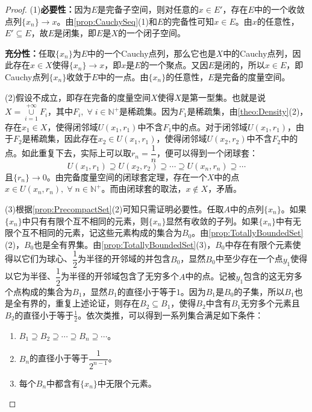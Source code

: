 \begin{proof}
	(1)\textbf{必要性：}因为$E$是完备子空间，则对任意的$x\in E'$，存在$E$中的一个收敛点列$\{x_n\}\to x$。由\cref{prop:CauchySeq}(1)和$E$的完备性可知$x\in E$。由$x$的任意性，$E'\subseteq E$，故$E$是闭集，即$E$是$X$的一个闭子空间。\par
	\textbf{充分性：}任取$\{x_n\}$为$E$中的一个Cauchy点列，那么它也是$X$中的Cauchy点列，因此存在$x\in X$使得$\{x_n\}\to x$，即$x$是$E$的一个聚点。又因$E$是闭的，所以$x\in E$，即Cauchy点列$\{x_n\}$收敛于$E$中的一点。由$\{x_n\}$的任意性，$E$是完备的度量空间。\par
	(2)假设不成立，即存在完备的度量空间$X$使得$X$是第一型集。也就是说$X=\underset{i=1}{\overset{+\infty}{\cup}}F_i$，其中$F_i,\;\forall\;i\in\mathbb{N}^+$是稀疏集。因为$F_1$是稀疏集，由\cref{theo:Density}(2)，存在$x_1\in X$，使得闭邻域$U(x_1,r_1)$中不含$F_1$中的点。对于闭邻域$U(x_1,r_1)$，由于$F_2$是稀疏集，因此存在$x_2\in U(x_1,r_1)$，使得闭邻域$U(x_2,r_2)$中不含$F_2$中的点。如此重复下去，实际上可以取$r_n=\dfrac{1}{n}$，便可以得到一个闭球套：
	\begin{equation*}
		U(x_1,r_1)\supseteq U(x_2,r_2)\supseteq\cdots\supseteq U(x_n,r_n)\supseteq\cdots
	\end{equation*}
	且$\{r_n\}\to0$。由完备度量空间的闭球套定理，存在一个$X$中的点$x\in U(x_n,r_n),\;\forall\;n\in\mathbb{N}^+$。而由闭球套的取法，$x\notin X$，矛盾。\par
	(3)根据\cref{prop:PrecompactSet}(2)可知只需证明必要性。任取$A$中的点列$\{x_n\}$。如果$\{x_n\}$中只有有限个互不相同的元素，则$\{x_n\}$显然有收敛的子列。如果$\{x_n\}$中有无限个互不相同的元素，记这些元素构成的集合为$B_0$。由\cref{prop:TotallyBoundedSet}(2)，$B_0$也是全有界集。由\cref{prop:TotallyBoundedSet}(3)，$B_0$中存在有限个元素使得以它们为球心、$\dfrac{1}{2}$为半径的开邻域的并包含$B_0$，显然$B_0$中至少存在一个点$y_1$使得以它为半径、$\dfrac{1}{2}$为半径的开邻域包含了无穷多个$A$中的点。记被$y_1$包含的这无穷多个点构成的集合为$B_1$，显然$B_1$的直径小于等于$1$。因为$B_1$是$B_0$的子集，所以$B_1$也是全有界的，重复上述论证，则存在$B_2\subseteq B_1$，使得$B_2$中含有$B_1$无穷多个元素且$B_2$的直径小于等于$\frac{1}{2}$。依次类推，可以得到一系列集合满足如下条件：
	\begin{enumerate}
		\item $B_1\supseteq B_2\supseteq\cdots\supseteq B_n\supseteq\cdots$。
		\item $B_n$的直径小于等于$\dfrac{1}{2^{n-1}}$。
		\item 每个$B_n$中都含有$\{x_n\}$中无限个元素。
	\end{enumerate}

\end{proof}
